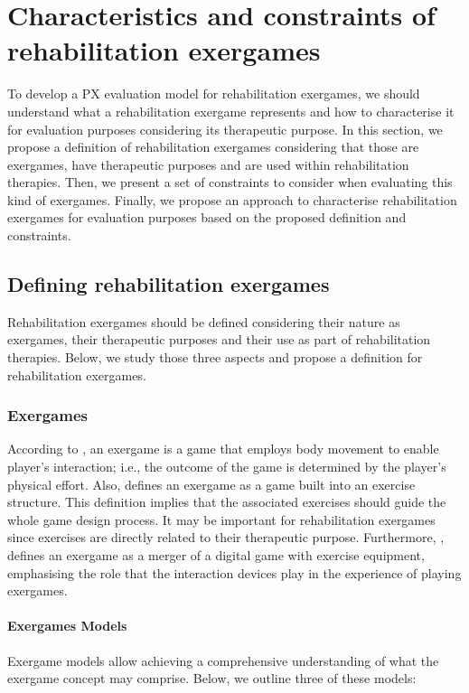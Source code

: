 \chapter{Characteristics and constraints of rehabilitation exergames}
\label{ch:characterising}

To develop a \ac{PX} evaluation model for rehabilitation exergames, we should understand what a rehabilitation exergame represents and how to characterise it for evaluation purposes considering its therapeutic purpose. In this section, we propose a definition of rehabilitation exergames considering that those are exergames, have therapeutic purposes and are used within rehabilitation therapies. Then, we present a set of constraints to consider when evaluating this kind of exergames. Finally, we propose an approach to characterise rehabilitation exergames for evaluation purposes based on the proposed definition and constraints.

\section{Defining rehabilitation exergames} %
\label{sec:def_reh_ex}
Rehabilitation exergames should be defined considering their nature as exergames, their therapeutic purposes and their use as part of rehabilitation therapies. Below, we study those three aspects and propose a definition for rehabilitation exergames.

\subsection{Exergames}
\label{sub:def_ex}
According to \textcite{Mueller2011}, an exergame is a game that employs body movement to enable player's interaction; i.e., the outcome of the game is determined by the player's physical effort. Also, \textcite{Pirovano2016} defines an exergame as a game built into an exercise structure. This definition implies that the associated exercises should guide the whole game design process. It may be important for rehabilitation exergames since exercises are directly related to their therapeutic purpose. Furthermore, \textcite{Sinclair2009}, defines an exergame as a merger of a digital game with exercise equipment, emphasising the role that the interaction devices play in the experience of playing exergames.

\subsubsection{Exergames Models}
\label{subsub:eg_models}
Exergame models allow achieving a comprehensive understanding of what the exergame concept may comprise. Below, we outline three of these models:

